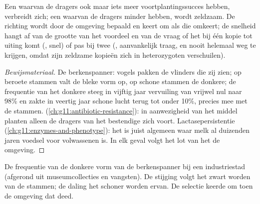 \begin{proposition}\label{prop:g12:selection-drift-speciation:direction}
Een  waarvan de dragers ook maar iets meer voortplantingssucces
hebben, verbreidt zich; een  waarvan de dragers minder hebben, wordt
zeldzaam. De richting wordt door de omgeving bepaald en keert om als die
omkeert; de snelheid hangt af van de grootte van het voordeel en van de
vraag of het  bij één kopie tot uiting komt (, snel) of pas
bij twee (, aanvankelijk traag, en nooit helemaal weg te krijgen,
omdat zijn zeldzame kopieën zich in heterozygoten verschuilen).
\end{proposition}
\begin{proof}[Bewijsmateriaal]
De berkenspanner: vogels pakken de vlinders die zij zien; op beroete
stammen valt de bleke vorm op, op schone stammen de donkere; de frequentie
van het donkere  steeg in vijftig jaar vervuiling van vrijwel nul
naar 98\% en zakte in veertig jaar schone lucht terug tot onder 10\%,
precies mee met de stammen. 
(\cref{ch:g11:antibiotic-resistance}): in aanwezigheid van het middel
planten alleen de dragers van het bestendige  zich voort.
Lactasepersistentie (\cref{ch:g11:enzymes-and-phenotype}): het  is
juist algemeen waar melk al duizenden jaren voedsel voor volwassenen is.
In elk geval volgt het lot van het  de omgeving.
\end{proof}

\begin{omfigure}

{\small De frequentie van de donkere vorm van de berkenspanner bij een
industriestad (afgerond uit museumcollecties en vangsten). De stijging
volgt het zwart worden van de stammen; de daling het schoner worden ervan.
De selectie keerde om toen de omgeving dat deed.}
\end{omfigure}

